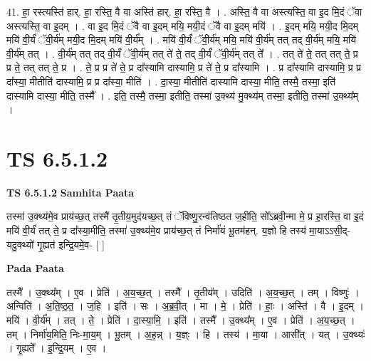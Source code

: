 \documentclass[17pt]{extarticle}
\begin{document}
41. हा॒ रस्त्यस्ति॑ हार्. हा॒ रस्ति॒ वै वा अस्ति॑ हार्. हा॒ रस्ति॒ वै । . अस्ति॒ वै वा अस्त्यस्ति॒ वा इ॒द मि॒दं ॅवा अस्त्यस्ति॒ वा इ॒दम् । . वा इ॒द मि॒दं ॅवै वा इ॒दम् मयि॒ मयी॒दं ॅवै वा इ॒दम् मयि॑ । . इ॒दम् मयि॒ मयी॒द मि॒दम् मयि॑ वी॒र्यं॑ ॅवी॒र्य॑म् मयी॒द मि॒दम् मयि॑ वी॒र्य᳚म् । . मयि॑ वी॒र्यं॑ ॅवी॒र्य॑म् मयि॒ मयि॑ वी॒र्य॑म् तत् तद् वी॒र्य॑म् मयि॒ मयि॑ वी॒र्य॑म् तत् । . वी॒र्य॑म् तत् तद् वी॒र्यं॑ ॅवी॒र्य॑म् तत् ते॑ ते॒ तद् वी॒र्यं॑ ॅवी॒र्य॑म् तत् ते᳚ । . तत् ते॑ ते॒ तत् तत् ते॒ प्र प्र ते॒ तत् तत् ते॒ प्र । . ते॒ प्र प्र ते॑ ते॒ प्र दा᳚स्यामि दास्यामि॒ प्र ते॑ ते॒ प्र दा᳚स्यामि । . प्र दा᳚स्यामि दास्यामि॒ प्र प्र दा᳚स्या॒ मीतीति॑ दास्यामि॒ प्र प्र दा᳚स्या॒ मीति॑ । . दा॒स्या॒ मीतीति॑ दास्यामि दास्या॒ मीति॒ तस्मै॒ तस्मा॒ इति॑ दास्यामि दास्या॒ मीति॒ तस्मै᳚ । . इति॒ तस्मै॒ तस्मा॒ इतीति॒ तस्मा॑ उ॒क्थ्य॑ मु॒क्थ्य॑म् तस्मा॒ इतीति॒ तस्मा॑ उ॒क्थ्य᳚म् । \newline
\pagebreak
{}

\section{ TS 6.5.1.2 }

\textbf{TS 6.5.1.2 } \newline
\textbf{Samhita Paata} \newline

तस्मा॑ उ॒क्थ्य॑मे॒व प्राय॑च्छ॒त् तस्मै॑ तृ॒तीय॒मुद॑यच्छ॒त् तं ॅविष्णु॒रन्व॑तिष्ठत ज॒हीति॒ सो᳚ऽब्रवी॒न्मा मे॒ प्र हा॒रस्ति॒ वा इ॒दं मयि॑ वी॒र्यं॑ तत् ते॒ प्र दा᳚स्या॒मीति॒ तस्मा॑ उ॒क्थ्य॑मे॒व प्राय॑च्छ॒त् तं निर्मा॑यं भू॒तम॑हन्. य॒ज्ञो हि तस्य॑ मा॒याऽऽसी॒द्-यदु॒क्थ्यो॑ गृ॒ह्यत॑ इन्द्रि॒यमे॒व- [  ] \newline

\textbf{Pada Paata} \newline

तस्मै᳚ । उ॒क्थ्य᳚म् । ए॒व । प्रेति॑ । अ॒य॒च्छ॒त् । तस्मै᳚ । तृ॒तीय᳚म् । उदिति॑ । अ॒य॒च्छ॒त् । तम् । विष्णुः॑ । अन्विति॑ । अ॒ति॒ष्ठ॒त॒ । ज॒हि । इति॑ । सः । अ॒ब्र॒वी॒त् । मा । मे॒ । प्रेति॑ । हाः॒ । अस्ति॑ । वै । इ॒दम् । मयि॑ । वी॒र्य᳚म् । तत् । ते॒ । प्रेति॑ । दा॒स्या॒मि॒ । इति॑ । तस्मै᳚ । उ॒क्थ्य᳚म् । ए॒व । प्रेति॑ । अ॒य॒च्छ॒त् । तम् । निर्मा॑य॒मिति॒ निः-मा॒य॒म् । भू॒तम् । अ॒ह॒न्न् । य॒ज्ञ्ः । हि । तस्य॑ । मा॒या । आसी᳚त् । यत् । उ॒क्थ्यः॑ । गृ॒ह्यते᳚ । इ॒न्द्रि॒यम् । ए॒व ।  \newline
\end{document}
